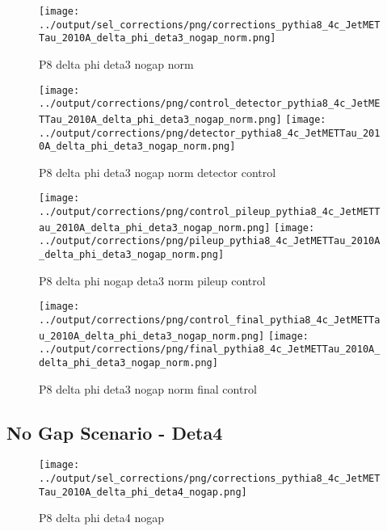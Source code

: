 \documentclass[11pt]{book}
\begin{document}
\begin{figure}[ht]
\centering
\texttt{[image: ../output/sel\_corrections/png/corrections\_pythia8\_4c\_JetMETTau\_2010A\_delta\_phi\_deta3\_nogap\_norm.png]}
\caption{P8 delta phi deta3 nogap norm}
\label{fig:p8_JetMETTau_2010A_delta_phi_deta3_nogap_norm}
\end{figure}

\begin{figure}[ht]
\centering
\texttt{[image: ../output/corrections/png/control\_detector\_pythia8\_4c\_JetMETTau\_2010A\_delta\_phi\_deta3\_nogap\_norm.png]}
\texttt{[image: ../output/corrections/png/detector\_pythia8\_4c\_JetMETTau\_2010A\_delta\_phi\_deta3\_nogap\_norm.png]}
\caption{P8 delta phi deta3 nogap norm detector control}
\label{fig:p8_JetMETTau_2010A_delta_phi_deta3_nogap_norm_detector_control}
\end{figure}

\begin{figure}[ht]
\centering
\texttt{[image: ../output/corrections/png/control\_pileup\_pythia8\_4c\_JetMETTau\_2010A\_delta\_phi\_deta3\_nogap\_norm.png]}
\texttt{[image: ../output/corrections/png/pileup\_pythia8\_4c\_JetMETTau\_2010A\_delta\_phi\_deta3\_nogap\_norm.png]}
\caption{P8 delta phi nogap deta3 norm pileup control}
\label{fig:p8_JetMETTau_2010A_delta_phi_deta3_nogap_norm_pileup_control}
\end{figure}


\begin{figure}[ht]
\centering
\texttt{[image: ../output/corrections/png/control\_final\_pythia8\_4c\_JetMETTau\_2010A\_delta\_phi\_deta3\_nogap\_norm.png]}
\texttt{[image: ../output/corrections/png/final\_pythia8\_4c\_JetMETTau\_2010A\_delta\_phi\_deta3\_nogap\_norm.png]}
\caption{P8 delta phi deta3 nogap norm final control}
\label{fig:p8_JetMETTau_2010A_delta_phi_deta3_nogap_norm_final_control}
\end{figure}




\clearpage
\subsection{No Gap Scenario - Deta4}

\begin{figure}[ht]
\centering
\texttt{[image: ../output/sel\_corrections/png/corrections\_pythia8\_4c\_JetMETTau\_2010A\_delta\_phi\_deta4\_nogap.png]}
\caption{P8 delta phi deta4 nogap}
\label{fig:p8_JetMETTau_2010A_delta_phi_deta4_nogap}
\end{figure}
\end{document}
